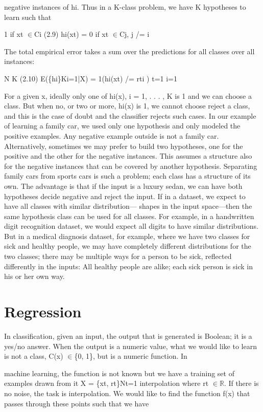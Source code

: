negative instances of hi. Thus in a K-class problem, we have K hypotheses to learn such that

1 if xt $\in$Ci (2.9) hi(xt) = 0 if xt $\in$Cj, j /= i

The total empirical error takes a sum over the predictions for all classes over all instances:

N K (2.10) E(\{hi\}Ki=1|X) = 1(hi(xt) /= rti ) t=1 i=1

For a given x, ideally only one of hi(x), i = 1, . . . , K is 1 and we can choose a class. But when no, or two or more, hi(x) is 1, we cannot choose reject a class, and this is the case of doubt and the classifier rejects such cases. In our example of learning a family car, we used only one hypothesis and only modeled the positive examples. Any negative example outside is not a family car. Alternatively, sometimes we may prefer to build two hypotheses, one for the positive and the other for the negative instances. This assumes a structure also for the negative instances that can be covered by another hypothesis. Separating family cars from sports cars is such a problem; each class has a structure of its own. The advantage is that if the input is a luxury sedan, we can have both hypotheses decide negative and reject the input. If in a dataset, we expect to have all classes with similar distribution--- shapes in the input space---then the same hypothesis class can be used for all classes. For example, in a handwritten digit recognition dataset, we would expect all digits to have similar distributions. But in a medical diagnosis dataset, for example, where we have two classes for sick and healthy people, we may have completely different distributions for the two classes; there may be multiple ways for a person to be sick, reflected differently in the inputs: All healthy people are alike; each sick person is sick in his or her own way.

\section{Regression}

In classification, given an input, the output that is generated is Boolean; it is a yes/no answer. When the output is a numeric value, what we would like to learn is not a class, C(x) $\in$\{0, 1\}, but is a numeric function. In

machine learning, the function is not known but we have a training set of examples drawn from it X = \{xt, rt\}Nt=1 interpolation where rt $\in$$\mathbb{R}$. If there is no noise, the task is interpolation. We would like to find the function f(x) that passes through these points such that we have

